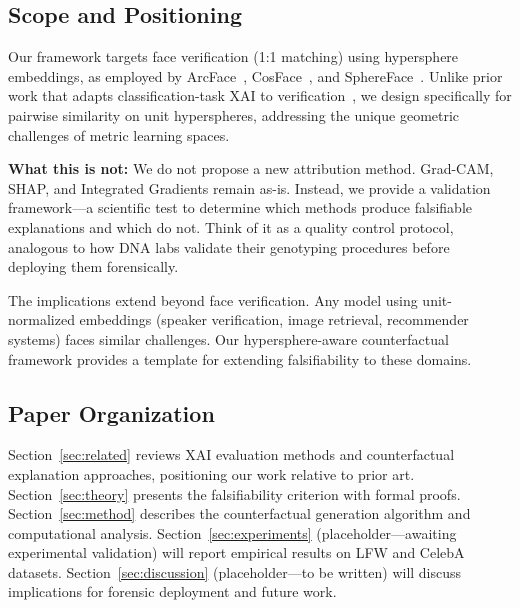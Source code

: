 \subsection{Scope and Positioning}

Our framework targets face verification (1:1 matching) using hypersphere embeddings, as employed by ArcFace~\citep{deng2019arcface}, CosFace~\citep{wang2018cosface}, and SphereFace~\citep{liu2017sphereface}. Unlike prior work that adapts classification-task XAI to verification~\citep{lin2021xcos}, we design specifically for pairwise similarity on unit hyperspheres, addressing the unique geometric challenges of metric learning spaces.

\textbf{What this is not:} We do not propose a new attribution method. Grad-CAM, SHAP, and Integrated Gradients remain as-is. Instead, we provide a validation framework—a scientific test to determine which methods produce falsifiable explanations and which do not. Think of it as a quality control protocol, analogous to how DNA labs validate their genotyping procedures before deploying them forensically.

The implications extend beyond face verification. Any model using unit-normalized embeddings (speaker verification, image retrieval, recommender systems) faces similar challenges. Our hypersphere-aware counterfactual framework provides a template for extending falsifiability to these domains.

\subsection{Paper Organization}

Section~\ref{sec:related} reviews XAI evaluation methods and counterfactual explanation approaches, positioning our work relative to prior art. Section~\ref{sec:theory} presents the falsifiability criterion with formal proofs. Section~\ref{sec:method} describes the counterfactual generation algorithm and computational analysis. Section~\ref{sec:experiments} (placeholder—awaiting experimental validation) will report empirical results on LFW and CelebA datasets. Section~\ref{sec:discussion} (placeholder—to be written) will discuss implications for forensic deployment and future work.
